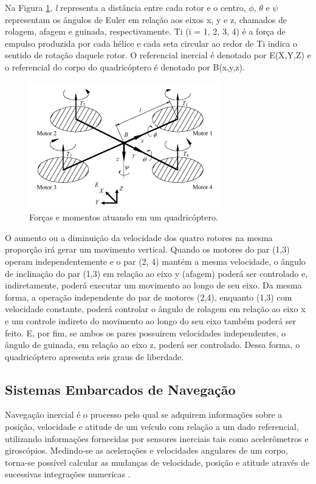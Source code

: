 \documentclass[a4paper, 12pt]{article}
\begin{document}
Na Figura \ref{fig:diag quad}, \textit{l} representa a distância entre cada rotor e o centro, $\phi$, $\theta$ e $\psi$ representam os ângulos de Euler em relação aos eixos x, y e z, chamados de rolagem, afagem e guinada, respectivamente. Ti (i = 1, 2, 3, 4) é a força de empulso produzida por cada hélice e cada seta circular ao redor de Ti indica o sentido de rotação daquele rotor. O referencial inercial é denotado por E(X,Y,Z) e o referencial do corpo do quadricóptero é denotado por B(x,y,z). 

\begin{figure}[h]
	\centering
		\includegraphics[scale=0.8]{img/diagrama_quadricoptero.png}
	\caption{Forças e momentos atuando em um quadricóptero.}
	\label{fig:diag quad}
\end{figure}

O aumento ou a diminuição da velocidade dos quatro rotores na mesma proporção irá gerar um movimento vertical. Quando os motores do par (1,3) operam independentemente e o par (2, 4) mantém a mesma velocidade, o ângulo de inclinação do par (1,3) em relação ao eixo y (afagem) poderá ser controlado e, indiretamente, poderá executar um movimento ao longo de seu eixo. Da mesma forma, a operação independente do par de motores (2,4), enquanto (1,3) com velocidade constante, poderá controlar o ângulo de rolagem em relação ao eixo x e um controle indireto do movimento ao longo do seu eixo também poderá ser feito. E, por fim, se ambos os pares possuírem velocidades independentes, o ângulo de guinada, em relação ao eixo z, poderá ser controlado. Dessa forma, o quadricóptero apresenta seis graus de liberdade. 

\subsection{Sistemas Embarcados de Navegação}

Navegação inercial é o processo pelo qual se adquirem informações sobre a posição, velocidade e atitude de um veículo com relação a um dado referencial, utilizando informações fornecidas por sensores inerciais tais como acelerômetros e giroscópios. Medindo-se as acelerações e velocidades angulares de um corpo, torna-se possível calcular as mudanças de velocidade, posição e atitude através de sucessivas integrações numericas \cite{Adalberto2009}.
\end{document}
